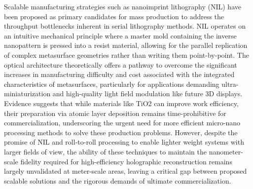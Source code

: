 \documentclass[11pt]{article}
\begin{document}
Scalable manufacturing strategies such as nanoimprint lithography (NIL) have been proposed as primary candidates for mass production to address the throughput bottlenecks inherent in serial lithography methods. NIL operates on an intuitive mechanical principle where a master mold containing the inverse nanopattern is pressed into a resist material, allowing for the parallel replication of complex metasurface geometries rather than writing them point-by-point. \citep{doi_10_3390_encyclopedia5040197_fe6bfdc9} \citep{doi_10_5772_intechopen_72534_9965e900} The optical architecture theoretically offers a pathway to overcome the significant increases in manufacturing difficulty and cost associated with the integrated characteristics of metasurfaces, particularly for applications demanding ultra-miniaturization and high-quality light field modulation like future 3D displays. Evidence suggests that while materials like TiO2 can improve work efficiency, their preparation via atomic layer deposition remains time-prohibitive for commercialization, underscoring the urgent need for more efficient micro-nano processing methods to solve these production problems. However, despite the promise of NIL and roll-to-roll processing to enable lighter weight systems with larger fields of view, the ability of these techniques to maintain the nanometer-scale fidelity required for high-efficiency holographic reconstruction remains largely unvalidated at meter-scale areas, leaving a critical gap between proposed scalable solutions and the rigorous demands of ultimate commercialization. \citep{doi_10_1515_nanoph_2025_0269_b999ce93}
\end{document}
